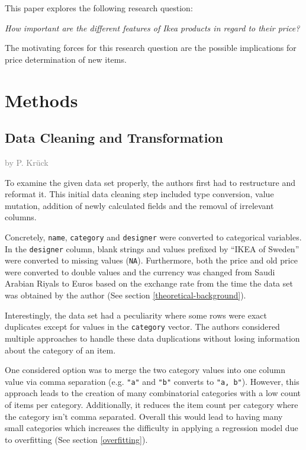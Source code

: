 \documentclass[a4paper, nobind]{templates/ociamthesis}
\begin{document}
This paper explores the following research question:

\emph{How important are the different features of Ikea products in regard to their price?}

The motivating forces for this research question are the possible implications for price determination of new items.

\hypertarget{methods}{%
\chapter{Methods}\label{methods}}

\hypertarget{datacleaning}{%
\section{Data Cleaning and Transformation}\label{datacleaning}}

\textcolor{gray}{by P. Krück}

To examine the given data set properly, the authors first had to restructure and reformat it. This initial data cleaning step included type conversion, value mutation, addition of newly calculated fields and the removal of irrelevant columns.

Concretely, \texttt{name}, \texttt{category} and \texttt{designer} were converted to categorical variables. In the \texttt{designer} column, blank strings and values prefixed by ``IKEA of Sweden'' were converted to missing values (\texttt{NA}). Furthermore, both the price and old price were converted to double values and the currency was changed from Saudi Arabian Riyals to Euros based on the exchange rate from the time the data set was obtained by the author (See section \ref{theoretical-background}).

Interestingly, the data set had a peculiarity where some rows were exact duplicates except for values in the \texttt{category} vector. The authors considered multiple approaches to handle these data duplications without losing information about the category of an item.

One considered option was to merge the two category values into one column value via comma separation (e.g. \texttt{"a"} and \texttt{"b"} converts to \texttt{"a,\ b"}). However, this approach leads to the creation of many combinatorial categories with a low count of items per category.
Additionally, it reduces the item count per category where the category isn't comma separated.
Overall this would lead to having many small categories which increases the difficulty in applying a regression model due to overfitting (See section \ref{overfitting}).
\end{document}
